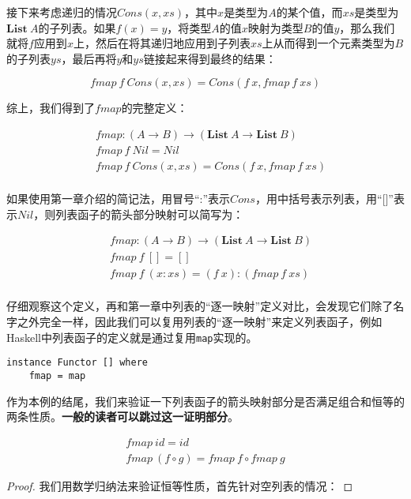 \documentclass{article}
\begin{document}
\begin{example}
接下来考虑递归的情况$Cons(x, xs)$，其中$x$是类型为$A$的某个值，而$xs$是类型为$\mathbf{List}\ A$的子列表。如果$f(x) = y$，将类型$A$的值$x$映射为类型$B$的值$y$，那么我们就将$f$应用到$x$上，然后在将其递归地应用到子列表$xs$上从而得到一个元素类型为$B$的子列表$ys$，最后再将$y$和$ys$链接起来得到最终的结果：

\[
fmap\ f\ Cons(x, xs) = Cons(f\ x, fmap\ f\ xs)
\]

综上，我们得到了$fmap$的完整定义：

\[
\begin{array}{l}
\quad    fmap : (A \to B) \to (\mathbf{List}\ A \to \mathbf{List}\ B) \\
\quad    fmap\ f\ Nil = Nil \\
\quad    fmap\ f\ Cons(x, xs) = Cons(f\ x, fmap\ f\ xs) \\
\end{array}
\]

如果使用第一章介绍的简记法，用冒号“:”表示$Cons$，用中括号表示列表，用“[]”表示$Nil$，则列表函子的箭头部分映射可以简写为：

\[
\begin{array}{l}
\quad    fmap : (A \to B) \to (\mathbf{List}\ A \to \mathbf{List}\ B) \\
\quad    fmap\ f\ [] = [] \\
\quad    fmap\ f\ (x:xs) = (f\ x):(fmap\ f\ xs) \\
\end{array}
\]

仔细观察这个定义，再和第一章中列表的“逐一映射”定义对比，会发现它们除了名字之外完全一样，因此我们可以复用列表的“逐一映射”来定义列表函子，例如Haskell中列表函子的定义就是通过复用\texttt{map}实现的。

\lstset{frame=single}
\begin{lstlisting}
instance Functor [] where
    fmap = map
\end{lstlisting}

作为本例的结尾，我们来验证一下列表函子的箭头映射部分是否满足组合和恒等的两条性质。\textbf{一般的读者可以跳过这一证明部分}。

\begin{mdframed}
\[
\begin{array}{l}
fmap\ id = id \\
fmap\ (f \circ g) = fmap\ f \circ fmap\ g
\end{array}
\]

\begin{proof}
我们用数学归纳法来验证恒等性质，首先针对空列表的情况：


\end{proof}
\end{mdframed}
\end{example}
\end{document}

